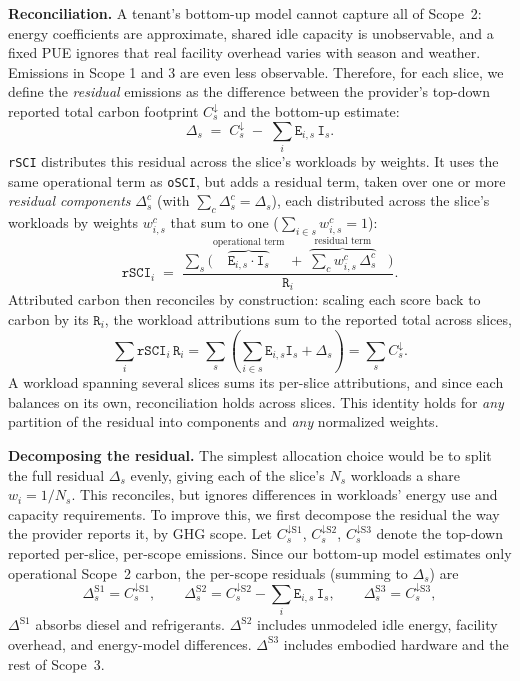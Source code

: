 \documentclass[sigconf,screen,nonacm]{acmart}
\newcommand{\parag}[1]{\vspace{2mm}\noindent\textbf{#1.}\hspace{2mm}}
\newcommand{\RSCI}{\texttt{rSCI}\xspace}
\newcommand{\OSCI}{\texttt{oSCI}\xspace}
\newcommand{\E}{\texttt{E}\xspace}
\newcommand{\I}{\texttt{I}\xspace}
\newcommand{\R}{\texttt{R}\xspace}
\begin{document}
\parag{Reconciliation}
A tenant's bottom-up model cannot capture all of Scope~2: energy coefficients are approximate, shared idle capacity is unobservable, and a fixed PUE ignores that real facility overhead varies with season and weather.
Emissions in Scope 1 and 3 are even less observable.
Therefore, for each slice, we define the \emph{residual} emissions as the difference between the provider's top-down reported total carbon footprint $C^{\downarrow}_{s}$ and the bottom-up estimate:
\begin{equation}
\Delta_{s} \;=\; C^{\downarrow}_{s} \;-\; \sum_i \E_{i,s}\,\I_s .
\label{eq:residual-total}
\end{equation}
\RSCI distributes this residual across the slice's workloads by weights.
It uses the same operational term as \OSCI, but adds a residual term, taken over one or more \emph{residual components} $\Delta^{c}_s$ (with $\sum_c \Delta^{c}_s = \Delta_s$), each distributed across the slice's workloads by weights $w^{c}_{i,s}$ that sum to one ($\sum_{i \in s} w^{c}_{i,s} = 1$):
\begin{equation}
\RSCI_i \;=\; \frac{\sum_s \bigl( \overbrace{\E_{i,s}\cdot\I_s}^\text{operational term} \;+\; \overbrace{\textstyle\sum_c w^{c}_{i,s}\,\Delta^{c}_{s}}^\text{residual term}\;\;\;\bigr)}{\R_i}.
\label{eq:rsci}
\end{equation}
Attributed carbon then reconciles by construction: scaling each score back to carbon by its $\R_i$, the workload attributions sum to the reported total across slices,
\begin{equation}
\textstyle\sum_i \RSCI_i\,\R_i
=
\textstyle\sum_s
\left(
\sum_{i \in s} \E_{i,s}\I_s
+
\Delta_s
\right)
=
\textstyle\sum_s C^\downarrow_s .
\label{eq:reconcile}
\end{equation}
A workload spanning several slices sums its per-slice attributions, and since each balances on its own, reconciliation holds across slices.
This identity holds for \emph{any} partition of the residual into components and \emph{any} normalized weights.

\parag{Decomposing the residual}
The simplest allocation choice would be to split the full residual $\Delta_s$ evenly, giving each of the slice's $N_s$ workloads a share $w_i = 1/N_s$.
This reconciles, but ignores differences in workloads' energy use and capacity requirements.
To improve this, we first decompose the residual the way the provider reports it, by GHG scope.
Let $C_{s}^{\downarrow\text{S1}}$, $C_{s}^{\downarrow\text{S2}}$, $C_{s}^{\downarrow\text{S3}}$ denote the top-down reported per-slice, per-scope emissions.
Since our bottom-up model estimates only operational Scope~2 carbon, the per-scope residuals (summing to $\Delta_s$) are
\begin{equation}
\Delta^{\text{S1}}_{s} = C^{\downarrow\text{S1}}_{s}, \qquad
\Delta^{\text{S2}}_{s} = C^{\downarrow\text{S2}}_{s} - \sum_i \E_{i,s}\,\I_s, \qquad
\Delta^{\text{S3}}_{s} = C^{\downarrow\text{S3}}_{s},
\label{eq:residual-scopes}
\end{equation}
$\Delta^{\text{S1}}$ absorbs diesel and refrigerants.
$\Delta^{\text{S2}}$ includes unmodeled idle energy, facility overhead, and energy-model differences.
$\Delta^{\text{S3}}$ includes embodied hardware and the rest of Scope~3.
\end{document}
